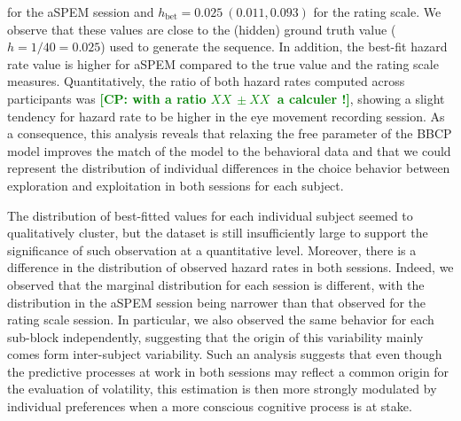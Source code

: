 \documentclass[12pt,english]{article}%
\newcommand{\ms}{\si{\milli\second}}%
\newcommand{\citep}[1]{\parencite{#1}}
\newcommand{\LP}[1]{\textbf{\textcolor{red}{[LP: #1]}}}
\newcommand{\CP}[1]{\textbf{\textcolor{green}{[CP: #1]}}}
\begin{document}
for the aSPEM session and
$h_{\text{bet}} = 0.025 ~ (0.011, 0.093)$ %
for the rating scale.
We observe that these values are close to the (hidden) ground truth value ($h=1/40=0.025$) used to generate the sequence. 
In addition, the best-fit hazard rate value is higher for aSPEM compared to the true value and the rating scale measures.
Quantitatively, the ratio of both hazard rates computed across participants was \CP{with a ratio $XX~ \pm XX~$ a calculer !},
showing a slight tendency for hazard rate to be higher in the eye movement recording session.
As a consequence, this analysis reveals
that relaxing the free parameter of the BBCP model
improves the match of the model to the behavioral data and
that we could represent the distribution of individual differences in the choice behavior
between exploration and exploitation
in both sessions for each subject.

The distribution of best-fitted values for each individual subject seemed to qualitatively cluster,
but the dataset is still insufficiently large to support the significance of such observation
at a quantitative level.
Moreover, there is a difference in the distribution of observed hazard rates in both sessions.
Indeed, we observed that the marginal distribution for each session is different,
with the distribution in the aSPEM session being narrower than
that observed for the rating scale session. 
In particular, we also observed the same behavior for each sub-block independently,
suggesting that the origin of this variability mainly comes form inter-subject variability.
Such an analysis suggests that even though the predictive processes
at work in both sessions may reflect a common origin for the evaluation of volatility,
this estimation is then more strongly modulated by individual preferences
when a more conscious cognitive process is at stake. 
\end{document}
